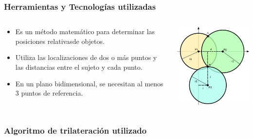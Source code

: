 \begin{frame}
	\frametitle{Herramientas y Tecnologías utilizadas}
	\begin{columns}
			\begin{column}{0.6\textwidth}
					\begin{itemize}
						\item {Es un método matemático para determinar las posiciones relativasde objetos.}
						\item {Utiliza las localizaciones de dos o más puntos y las distancias entre el sujeto y cada punto.}
						\item {En un plano bidimensional, se necesitan al menos 3 puntos de referencia.}
					\end{itemize}
				\endblock{}
			\end{column}
			\begin{column}{0.4\textwidth}
				\vfill 
					\begin{center}
						\includegraphics[width=0.8\linewidth]{Images/trilateration}
					\end{center}
			\end{column}
	\end{columns}
\end{frame}

\begin{frame}
	\frametitle{Algoritmo de trilateración utilizado}
	
\end{frame}

